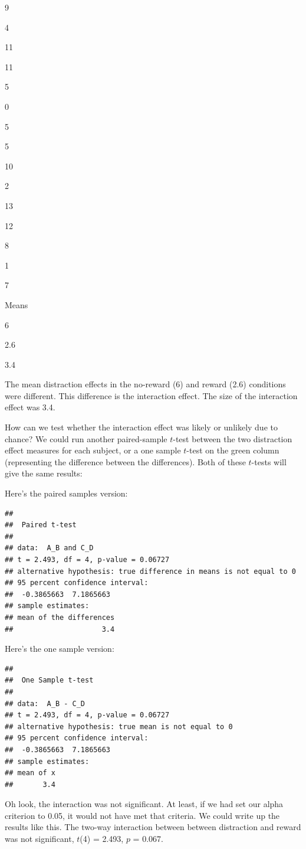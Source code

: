 \documentclass[]{book}
\begin{document}
9

4

11

11

5

0

5

5

10

2

13

12

8

1

7

Means

6

2.6

3.4

The mean distraction effects in the no-reward (6) and reward (2.6) conditions were different. This difference is the interaction effect. The size of the interaction effect was 3.4.

How can we test whether the interaction effect was likely or unlikely due to chance? We could run another paired-sample \(t\)-test between the two distraction effect measures for each subject, or a one sample \(t\)-test on the green column (representing the difference between the differences). Both of these \(t\)-tests will give the same results:

Here's the paired samples version:

\begin{verbatim}
## 
## 	Paired t-test
## 
## data:  A_B and C_D
## t = 2.493, df = 4, p-value = 0.06727
## alternative hypothesis: true difference in means is not equal to 0
## 95 percent confidence interval:
##  -0.3865663  7.1865663
## sample estimates:
## mean of the differences 
##                     3.4
\end{verbatim}

Here's the one sample version:

\begin{verbatim}
## 
## 	One Sample t-test
## 
## data:  A_B - C_D
## t = 2.493, df = 4, p-value = 0.06727
## alternative hypothesis: true mean is not equal to 0
## 95 percent confidence interval:
##  -0.3865663  7.1865663
## sample estimates:
## mean of x 
##       3.4
\end{verbatim}

Oh look, the interaction was not significant. At least, if we had set our alpha criterion to 0.05, it would not have met that criteria. We could write up the results like this. The two-way interaction between between distraction and reward was not significant, \(t\)(4) = 2.493, \(p\) = 0.067.
\end{document}
